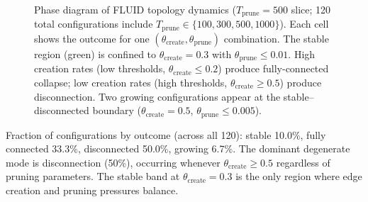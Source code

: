 \documentclass[12pt]{article}
\begin{document}
\begin{figure}[H]
\caption{Phase diagram of FLUID topology dynamics ($T_{\mathrm{prune}}=500$ slice; 120 total configurations include $T_{\mathrm{prune}} \in \{100,300,500,1000\}$). Each cell shows the outcome for one $(\theta_{\mathrm{create}}, \theta_{\mathrm{prune}})$ combination. The stable region (green) is confined to $\theta_{\mathrm{create}} = 0.3$ with $\theta_{\mathrm{prune}} \leq 0.01$. High creation rates (low thresholds, $\theta_{\mathrm{create}} \leq 0.2$) produce fully-connected collapse; low creation rates (high thresholds, $\theta_{\mathrm{create}} \geq 0.5$) produce disconnection. Two growing configurations appear at the stable--disconnected boundary ($\theta_{\mathrm{create}}=0.5$, $\theta_{\mathrm{prune}} \leq 0.005$).}
\label{fig:phase_diagram}
\end{figure}

Fraction of configurations by outcome (across all 120): stable 10.0\%, fully connected 33.3\%, disconnected 50.0\%, growing 6.7\%. The dominant degenerate mode is disconnection (50\%), occurring whenever $\theta_{\text{create}} \geq 0.5$ regardless of pruning parameters. The stable band at $\theta_{\text{create}} = 0.3$ is the only region where edge creation and pruning pressures balance.
\end{document}
